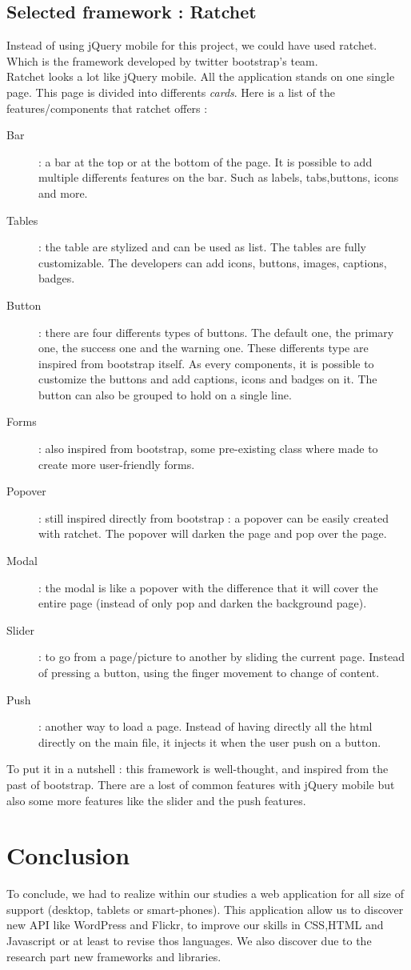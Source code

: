 \documentclass[12pt]{report}%
\begin{document}
\section{Selected framework : Ratchet}
Instead of using jQuery mobile for this project, we could have used ratchet. Which is the framework developed by twitter bootstrap's team.\\
Ratchet looks a lot like jQuery mobile. All the application stands on one single page. This page is divided into differents \textit{cards}.
Here is a list of the features/components that ratchet offers :
\begin{description}
	\item[Bar] : a bar at the top or at the bottom of the page. It is possible to add multiple differents features on the bar. Such as  labels, tabs,buttons, icons and more.
	\item[Tables] : the table are stylized and can be used as list. The tables are fully customizable. The developers can add icons, buttons, images, captions, badges.
	\item[Button] : there are four differents types of buttons. The default one, the primary one, the success one and the warning one. These differents type are inspired from bootstrap itself. As every components, it is possible to customize the buttons and add captions, icons and badges on it. The button can also be grouped to hold on a single line.
	\item[Forms] : also inspired from bootstrap, some pre-existing class where made to create more user-friendly forms.
	\item[Popover] : still inspired directly from bootstrap : a popover can be easily created with ratchet. The popover will darken the page and pop over the page.
	\item[Modal] : the modal is like a popover with the difference that it will cover the entire page (instead of only pop and darken the background page).
	\item[Slider] : to go from a page/picture to another by sliding the current page. Instead of pressing a button, using the finger movement to change of content.
	\item[Push] : another way to load a page. Instead of having directly all the html directly on the main file, it injects it when the user push on a button.
\end{description}
To put it in a nutshell : this framework is well-thought, and inspired from the past of bootstrap. There are a lost of common features with jQuery mobile but also some more features like the slider and the push features.

\chapter{Conclusion}
To conclude, we had to realize within our studies a web application for all size of support (desktop, tablets or smart-phones). This application allow us to discover new API like WordPress and Flickr, to improve our skills in CSS,HTML and Javascript or at least to revise thos languages. We also discover due to the research part new frameworks and libraries.
\clearpage
\end{document}
